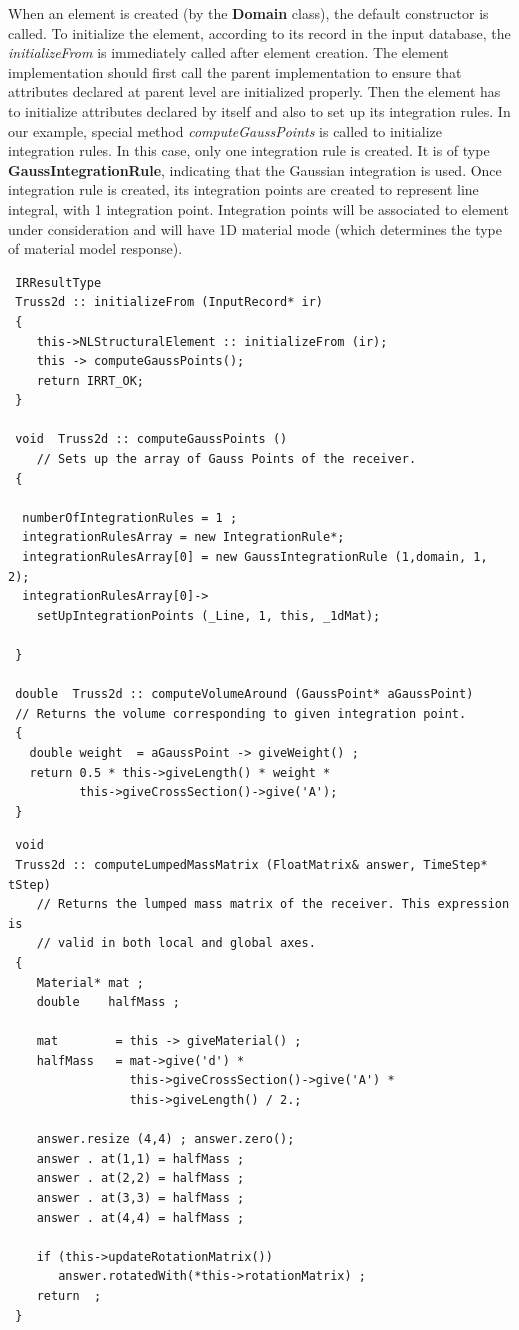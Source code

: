 \documentclass[a4paper]{article}
\newcommand{\class}[1]{{\bf #1}}
\newcommand{\service}[1]{{\em #1}}
\begin{document}
 When an element is created (by the \class{Domain} class), the default
 constructor is called. To initialize the element, according to its
 record in the input database, the \service{initializeFrom} is
 immediately called after element creation. The element implementation
 should first call the parent implementation to ensure that attributes
 declared at parent level are initialized properly. Then the element has to
 initialize attributes declared by itself and also to set up its
 integration rules. In our example, special method
 \service{computeGaussPoints} is called to
 initialize integration rules.
 In this case, only one integration rule is created. It is of type 
 \class{GaussIntegrationRule}, indicating that the Gaussian  integration
 is used. Once integration rule is created, its integration points are 
 created to represent line integral, with 1 integration
 point. Integration points will be associated to element under
 consideration and will have 1D material mode (which determines the type of
 material model response).
 \begin{verbatim}
 IRResultType
 Truss2d :: initializeFrom (InputRecord* ir)
 {
    this->NLStructuralElement :: initializeFrom (ir);
    this -> computeGaussPoints();
    return IRRT_OK;
 }

 void  Truss2d :: computeGaussPoints ()
    // Sets up the array of Gauss Points of the receiver.
 {

  numberOfIntegrationRules = 1 ;
  integrationRulesArray = new IntegrationRule*;
  integrationRulesArray[0] = new GaussIntegrationRule (1,domain, 1, 2);
  integrationRulesArray[0]->
    setUpIntegrationPoints (_Line, 1, this, _1dMat);

 }

 double  Truss2d :: computeVolumeAround (GaussPoint* aGaussPoint)
 // Returns the volume corresponding to given integration point. 
 {
   double weight  = aGaussPoint -> giveWeight() ;
   return 0.5 * this->giveLength() * weight * 
          this->giveCrossSection()->give('A');
 }
 \end{verbatim}


 \begin{verbatim}
 void
 Truss2d :: computeLumpedMassMatrix (FloatMatrix& answer, TimeStep* tStep)
    // Returns the lumped mass matrix of the receiver. This expression is
    // valid in both local and global axes.
 {
    Material* mat ;
    double    halfMass ;

    mat        = this -> giveMaterial() ;
    halfMass   = mat->give('d') * 
                 this->giveCrossSection()->give('A') * 
                 this->giveLength() / 2.;

    answer.resize (4,4) ; answer.zero();
    answer . at(1,1) = halfMass ;
    answer . at(2,2) = halfMass ;
    answer . at(3,3) = halfMass ;
    answer . at(4,4) = halfMass ;

    if (this->updateRotationMatrix()) 
       answer.rotatedWith(*this->rotationMatrix) ;
    return  ;
 }
 \end{verbatim}
\end{document}
